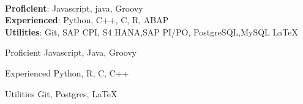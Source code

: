 \ifdefined\ONEPAGE
\\
\textbf{Proficient}: Javascript, java, Groovy\\\vspace{0.3mm}
\textbf{Experienced}: Python, C++, C, R, ABAP\\\vspace{0.3mm}
\textbf{Utilities}: Git, SAP CPI, S4 HANA,SAP PI/PO, PostgreSQL,MySQL
\LaTeX

\else
\begin{cvskills}

  \cvskill
  {Proficient}
  {Javascript, Java, Groovy}

  \cvskill
  {Experienced}
  {Python, R, C, C++}

  \cvskill
  {Utilities}
  {Git, Postgres,
 \LaTeX}

\end{cvskills}
\fi
